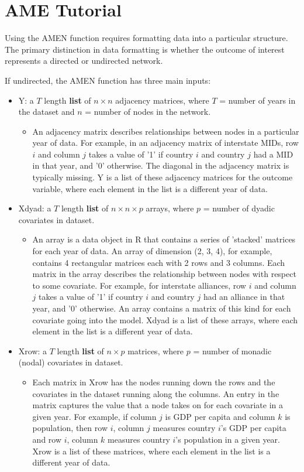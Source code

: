 \section{AME Tutorial}

Using the AMEN function requires formatting data into a particular structure. The primary distinction in data formatting is whether the outcome of interest represents a directed or undirected network.

If undirected, the AMEN function has three main inputs:

\begin{itemize}[noitemsep,nolistsep]
    \item Y: a $T$ length \textbf{list} of $n\times n$ adjacency matrices, where $T$ = number of years in the dataset and $n$ = number of nodes in the network.
    \begin{itemize}
      \item An adjacency matrix describes relationships between nodes in a particular year of data. For example, in an adjacency matrix of interstate MIDs, row $i$ and column $j$ takes a value of '1' if country $i$ and country $j$ had a MID in that year, and '0' otherwise. The diagonal in the adjacency matrix is typically missing. Y is a list of these adjacency matrices for the outcome variable, where each element in the list is a different year of data.
    \end{itemize}
    \item Xdyad: a $T$ length \textbf{list} of $n\times n\times p$ arrays, where $p$ = number of dyadic covariates in dataset.
    \begin{itemize}
      \item An array is a data object in R that contains a series of 'stacked' matrices for each year of data. An array of dimension (2, 3, 4), for example, contains 4 rectangular matrices each with 2 rows and 3 columns. Each matrix in the array describes the relationship between nodes with respect to some covariate. For example, for interstate alliances, row $i$ and column $j$ takes a value of '1' if country $i$ and country $j$ had an alliance in that year, and '0' otherwise. An array contains a matrix of this kind for each covariate going into the model. Xdyad is a list of these arrays, where each element in the list is a different year of data.
    \end{itemize}
    \item Xrow: a $T$ length \textbf{list} of $n\times p$ matrices, where $p$ = number of monadic (nodal) covariates in dataset.
    \begin{itemize}
      \item Each matrix in Xrow has the nodes running down the rows and the covariates in the dataset running along the columns. An entry in the matrix captures the value that a node takes on for each covariate in a given year. For example, if column $j$ is GDP per capita and column $k$ is population, then row $i$, column $j$ measures country $i$'s GDP per capita and row $i$, column $k$ measures country $i$'s population in a given year. Xrow is a list of these matrices, where each element in the list is a different year of data.
    \end{itemize}
\end{itemize}

